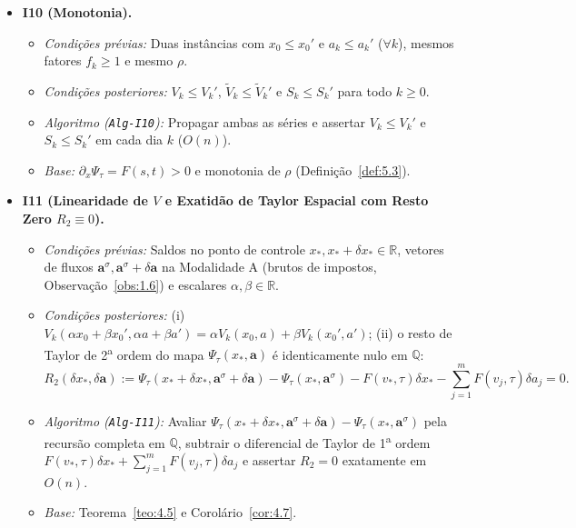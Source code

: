 \documentclass[11pt, a4paper]{article}
\theoremstyle{definition}
\theoremstyle{plain}
\theoremstyle{remark}
\begin{document}
\begin{itemize}
    \item \textbf{I10 (Monotonia).}
    \begin{itemize}
        \item \emph{Condições prévias:} Duas instâncias com $x_0 \le x_0'$ e $a_k \le a_k'$ ($\forall k$), mesmos fatores $f_k \ge 1$ e mesmo $\rho$.
        \item \emph{Condições posteriores:} $V_k \le V_k'$, $\tilde{V}_k \le \tilde{V}_k'$ e $S_k \le S_k'$ para todo $k \ge 0$.
        \item \emph{Algoritmo (\texttt{Alg-I10}):} Propagar ambas as séries e assertar $V_k \le V_k'$ e $S_k \le S_k'$ em cada dia $k$ ($O(n)$).
        \item \emph{Base:} $\partial_x \Psi_\tau = F(s,t) > 0$ e monotonia de $\rho$ (Definição~\ref{def:5.3}).
    \end{itemize}

    \item \textbf{I11 (Linearidade de $V$ e Exatidão de Taylor Espacial com Resto Zero $R_2 \equiv 0$).}
    \begin{itemize}
        \item \emph{Condições prévias:} Saldos no ponto de controle $x_*, x_* + \delta x_* \in \mathbb{R}$, vetores de fluxos $\mathbf{a}^\sigma, \mathbf{a}^\sigma + \delta\mathbf{a}$ na Modalidade A (brutos de impostos, Observação~\ref{obs:1.6}) e escalares $\alpha, \beta \in \mathbb{R}$.
        \item \emph{Condições posteriores:} (i) $V_k(\alpha x_0 + \beta x_0', \alpha a + \beta a') = \alpha V_k(x_0, a) + \beta V_k(x_0', a')$; (ii) o resto de Taylor de 2\textsuperscript{a} ordem do mapa $\Psi_\tau(x_*, \mathbf{a})$ é identicamente nulo em $\mathbb{Q}$:
        \[
        R_2(\delta x_*, \delta\mathbf{a}) := \Psi_\tau(x_* + \delta x_*, \mathbf{a}^\sigma + \delta\mathbf{a}) - \Psi_\tau(x_*, \mathbf{a}^\sigma) - F(v_*, \tau)\delta x_* - \sum_{j=1}^m F(v_j, \tau)\delta a_j = 0.
        \]
        \item \emph{Algoritmo (\texttt{Alg-I11}):} Avaliar $\Psi_\tau(x_* + \delta x_*, \mathbf{a}^\sigma + \delta\mathbf{a}) - \Psi_\tau(x_*, \mathbf{a}^\sigma)$ pela recursão completa em $\mathbb{Q}$, subtrair o diferencial de Taylor de 1\textsuperscript{a} ordem $F(v_*, \tau)\delta x_* + \sum_{j=1}^m F(v_j, \tau)\delta a_j$ e assertar $R_2 = 0$ exatamente em $O(n)$.
        \item \emph{Base:} Teorema~\ref{teo:4.5} e Corolário~\ref{cor:4.7}.
    \end{itemize}
\end{itemize}
\end{document}

